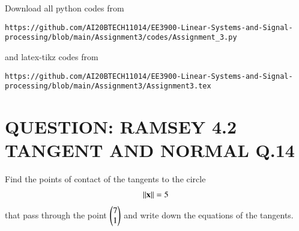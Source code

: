 \documentclass[journal,12pt,twocolumn]{IEEEtran}
\begin{document}
\maketitle
\newpage
\bigskip
\renewcommand{\thefigure}{\theenumi}
\renewcommand{\thetable}{\theenumi}
Download all python codes from 
\begin{lstlisting}
https://github.com/AI20BTECH11014/EE3900-Linear-Systems-and-Signal-processing/blob/main/Assignment3/codes/Assignment_3.py
\end{lstlisting}
%
and latex-tikz codes from 
%
\begin{lstlisting}
https://github.com/AI20BTECH11014/EE3900-Linear-Systems-and-Signal-processing/blob/main/Assignment3/Assignment3.tex
\end{lstlisting}
\vspace{0.5cm}
\section{QUESTION: RAMSEY 4.2 TANGENT AND NORMAL Q.14}
 Find the points of contact of the tangents to
the circle
\begin{align}
\lVert\mathbf{x}\rVert=5 \label{eq:1}
\end{align}
that pass through the point $\begin{pmatrix}7 \\ 1\end{pmatrix}$ and write down the equations of the tangents.
\end{document}
